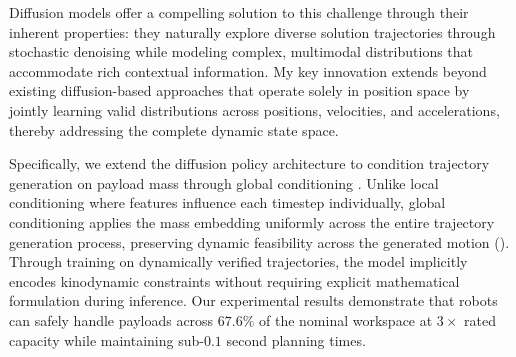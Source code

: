 Diffusion models offer a compelling solution to this challenge through their inherent properties: they naturally explore diverse solution trajectories through stochastic denoising \cite{chi2023diffusion} while modeling complex, multimodal distributions that accommodate rich contextual information. My key innovation extends beyond existing diffusion-based approaches that operate solely in position space \cite{carvalho2023motion,saha2024edmp} by jointly learning valid distributions across positions, velocities, and accelerations, thereby addressing the complete dynamic state space.

Specifically, we extend the diffusion policy architecture to condition trajectory generation on payload mass through global conditioning \cite{chi2023diffusion}. Unlike local conditioning where features influence each timestep individually, global conditioning applies the mass embedding uniformly across the entire trajectory generation process, preserving dynamic feasibility across the generated motion ().
Through training on dynamically verified trajectories, the model implicitly encodes kinodynamic constraints without requiring explicit mathematical formulation during inference. Our experimental results demonstrate that robots can safely handle payloads across $67.6\%$ of the nominal workspace at $3\times$ rated capacity while maintaining sub-$0.1$ second planning times.


